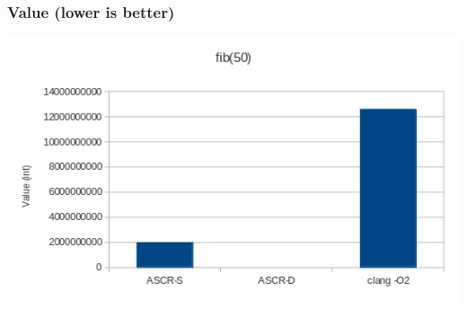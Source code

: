\documentclass{beamer}
\begin{document}
\begin{frame}
\frametitle{Value (lower is better)}
\centering
\includegraphics[scale=.5]{../value.png}
\end{frame}

\begin{frame}
\end{frame}
\end{document}
